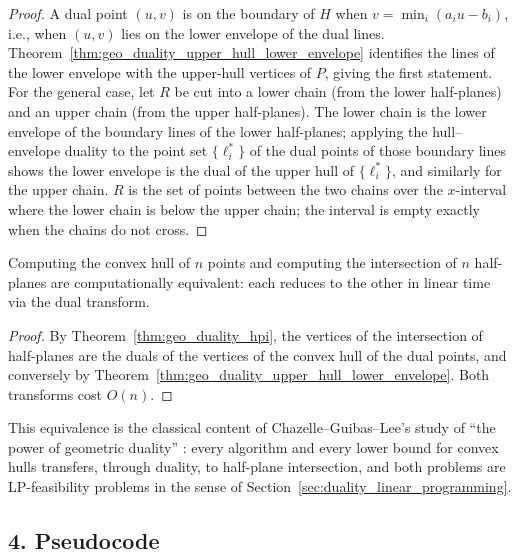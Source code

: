 \begin{proof}
  A dual point $(u,v)$ is on the boundary of $H$ when
  $v = \min_i (a_i u - b_i)$, i.e., when $(u,v)$ lies on the lower envelope
  of the dual lines. Theorem~\ref{thm:geo_duality_upper_hull_lower_envelope}
  identifies the lines of the lower envelope with the upper-hull vertices of
  $P$, giving the first statement. For the general case, let $R$ be cut into
  a lower chain (from the lower half-planes) and an upper chain (from the
  upper half-planes). The lower chain is the lower envelope of the boundary
  lines of the lower half-planes; applying the hull--envelope duality to the
  point set $\{\ell_i^*\}$ of the dual points of those boundary lines shows
  the lower envelope is the dual of the upper hull of $\{\ell_i^*\}$, and
  similarly for the upper chain. $R$ is the set of points between the two
  chains over the $x$-interval where the lower chain is below the upper
  chain; the interval is empty exactly when the chains do not cross.
\end{proof}

\begin{corollary}\label{cor:geo_duality_hpi_hull}
  Computing the convex hull of $n$ points and computing the intersection of
  $n$ half-planes are computationally equivalent: each reduces to the other
  in linear time via the dual transform.
\end{corollary}

\begin{proof}
  By Theorem~\ref{thm:geo_duality_hpi}, the vertices of the intersection of
  half-planes are the duals of the vertices of the convex hull of the dual
  points, and conversely by Theorem~\ref{thm:geo_duality_upper_hull_lower_envelope}.
  Both transforms cost $O(n)$.
\end{proof}

This equivalence is the classical content of Chazelle--Guibas--Lee's study
of ``the power of geometric duality'' \cite{chazelle1985power}: every
algorithm and every lower bound for convex hulls transfers, through duality,
to half-plane intersection, and both problems are LP-feasibility problems in
the sense of Section~\ref{sec:duality_linear_programming}.

\subsection{4. Pseudocode}

